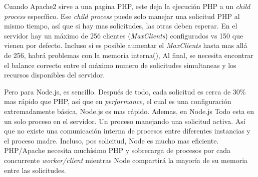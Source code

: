 Cuando Apache2 sirve a una pagina PHP, este deja la ejecución PHP a un \textit{child process} específico. Ese \textit{child process} puede solo manejar una solicitud PHP al mismo tiempo, así que si hay mas solicitudes, las otras deben esperar. En el servidor hay un máximo de 256 clientes (\textit{MaxClients}) configurados vs 150 que vienen por defecto. Incluso si es posible aumentar el \textit{MaxClients} hasta mas allá de 256, habrá problemas con la memoria interna(), Al final, se necesita encontrar el balance correcto entre el máximo numero de solicitudes simultaneas y los recursos disponibles del servidor.

Pero para Node.js, es sencillo. Después de todo, cada solicitud es cerca de 30\% mas rápido que PHP, así que en \textit{performance}, el cual es una configuración extremadamente básica, Node.js es mas rápido. Ademas, en Node.js Todo esta en un solo proceso en el servidor. Un proceso manejando una solicitud activa. Así que no existe una comunicación interna de procesos entre diferentes instancias y el proceso madre. Incluso, pos solicitud, Node es mucho mas eficiente. PHP/Apache necesita muchísimo PHP y sobrecarga de procesos por cada concurrente \textit{worker/client} mientras Node compartirá la mayoría de su memoria entre las solicitudes.


